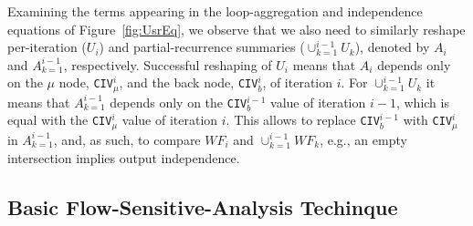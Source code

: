 \documentclass{sig-alternate}
\begin{document}
%
Examining the terms appearing in the loop-aggregation and independence 
equations of Figure~\ref{fig:UsrEq}, we observe that we also need to similarly
reshape per-iteration ($U_i$) and partial-recurrence summaries 
($\cup_{k=1}^{i-1} U_k$), 
denoted by $A_i$ and $A_{k=1}^{i-1}$, respectively. 
%
Successful reshaping of $U_i$ means that $A_i$
depends only on the $\mu$ node, {\tt CIV}$_{\mu}^{i}$, 
and the back node, {\tt CIV}$_{b}^{i}$, of iteration $i$.
For $\cup_{k=1}^{i-1} U_k$ it means that $A_{k=1}^{i-1}$ depends
only on the {\tt CIV}$_{b}^{i-1}$ value of iteration $i-1$, which is
equal with the  {\tt CIV}$_{\mu}^{i}$ value of iteration $i$.
This allows to replace {\tt CIV}$_b^{i-1}$ with {\tt CIV}$_{\mu}^i$ in
$A_{k=1}^{i-1}$, and, as such, to compare $WF_i$ and $\cup_{k=1}^{i-1} WF_k$, 
e.g., an empty intersection implies output independence. 
%

\subsection{Basic Flow-Sensitive-Analysis Techinque}
\label{subsec:BasicTechn}
\end{document}
